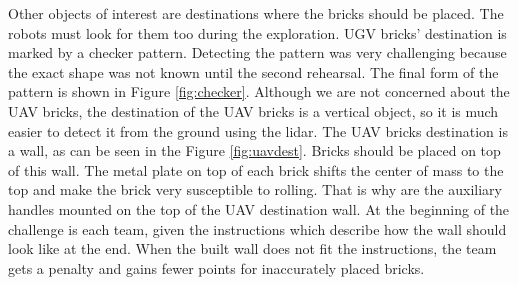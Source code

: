 Other objects of interest are destinations where the bricks should be placed. The robots must look for them too during the exploration. UGV bricks' destination is marked by a checker pattern. Detecting the pattern was very challenging because the exact shape was not known until the second rehearsal. The final form of the pattern is shown in Figure \ref{fig:checker}. Although we are not concerned about the UAV bricks, the destination of the UAV bricks is a vertical object, so it is much easier to detect it from the ground using the lidar. The UAV bricks destination is a wall, as can be seen in the Figure \ref{fig:uavdest}. Bricks should be placed on top of this wall. The metal plate on top of each brick shifts the center of mass to the top and make the brick very susceptible to rolling. That is why are the auxiliary handles mounted on the top of the UAV destination wall. At the beginning of the challenge is each team, given the instructions which describe how the wall should look like at the end. When the built wall does not fit the instructions, the team gets a penalty and gains fewer points for inaccurately placed bricks.


